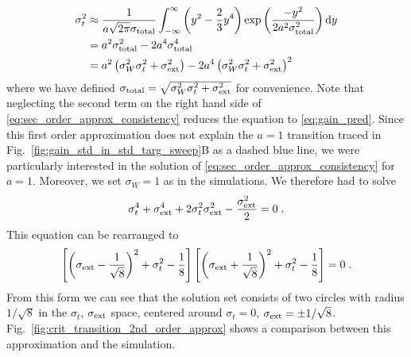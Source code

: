 \documentclass[10pt,a4paper]{article}
\begin{document}
\begin{align}
\sigma_{t}^2 &\approx \frac{1}{a\sqrt{2 \pi}\sigma_{\rm total}}\int_{-\infty}^{\infty}\left( y^2 - \frac{2}{3}y^4\right)\exp\left( \frac{-y^2}{2a^2\sigma_{\rm total}^2}\right) \mathrm{d}y \\
&= a^2\sigma_{\rm total}^2 - 2a^4\sigma_{\rm total}^4 \\
&= a^2\left( \sigma^2_{W}\sigma^2_{t} + \sigma^2_{\rm ext} \right) - 2a^4 \left( \sigma^2_{W}\sigma^2_{t} + \sigma^2_{\rm ext} \right)^2 \label{eq:sec_order_approx_consistency}
\end{align}
where we have defined $\sigma_{\rm total} = \sqrt{\sigma^2_{W}\sigma^2_{t} + \sigma^2_{\rm ext}}$ for convenience. Note that neglecting the second term on the right hand side of \eqref{eq:sec_order_approx_consistency} reduces the equation to \eqref{eq:gain_pred}. Since this first order approximation does not explain the $a=1$ transition traced in Fig.~\ref{fig:gain_std_in_std_targ_sweep}B as a dashed blue line, we were particularly interested in the solution of \eqref{eq:sec_order_approx_consistency} for $a=1$. Moreover, we set $\sigma_{W}=1$ as in the simulations. We therefore had to solve
\begin{equation}
	\sigma_{t}^4 + \sigma_{\rm ext}^4 + 2\sigma_{t}^2\sigma_{\rm ext}^2 - \frac{\sigma_{\rm ext}^2}{2} = 0 \; .
\end{equation}
This equation can be rearranged to
\begin{equation}
	\left[\left(\sigma_{\rm ext} - \frac{1}{\sqrt{8}}\right)^2 + \sigma_{t}^2 - \frac{1}{8}\right]\left[\left(\sigma_{\rm ext} + \frac{1}{\sqrt{8}}\right)^2 + \sigma_{t}^2 - \frac{1}{8}\right] = 0 \; . \label{eq:circles_solution_form}
\end{equation}
From this form we can see that the solution set consists of two circles with radius $1/\sqrt{8}$ in the $\sigma_{t}$, $\sigma_{\rm ext}$ space, centered around $\sigma_{t} = 0$, $\sigma_{\rm ext} = \pm 1/\sqrt{8}$. Fig.~\ref{fig:crit_transition_2nd_order_approx} shows a comparison between this approximation and the simulation.
\end{document}
